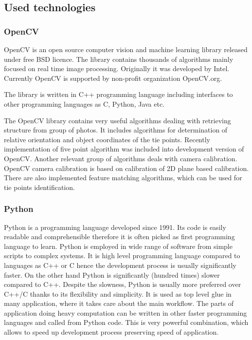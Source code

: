 \documentclass[a4paper,12pt]{article}
\begin{document}
\subsection{Used technologies}

\subsubsection{OpenCV}


OpenCV is an open source computer vision and machine learning library released under free BSD licence.
The library contains thousands of algorithms mainly focused on real time image processing.
Originally it was developed by Intel. Currently OpenCV is supported by non-profit organization OpenCV.org.

The library is written in C++ programming language including interfaces to other programming languages as C, Python, Java etc. 

The OpenCV library contains very useful algorithms dealing with retrieving structure from group 
of photos. It includes algorithms for determination of relative orientation 
and object coordinates of the tie points.
Recently implementation of five point algorithm was included into development version of OpenCV.
Another relevant group of algorithms deals with camera calibration. OpenCV  camera calibration
is based on calibration of 2D plane based calibration.  
There are also implemented feature matching algorithms, which can be used for tie points identification. 


\subsubsection{Python}

Python is a programming language developed since 1991. 
Its code is easily readable and comprehensible therefore it is often picked as first programming
language to learn. Python is employed in wide range of software from simple scripts to complex systems.
It is high level programming language compared to languages as C++ or C hence 
the development process is usually significantly faster. On the other hand 
Python is significantly (hundred times) slower compared to C++. Despite the slowness, 
 Python is usually more preferred over C++/C thanks to its flexibility and simplicity.
It is used as top level glue in many application, where it takes care about 
the main workflow. The parts of application doing heavy computation can 
be written in other faster programming languages and called 
from Python code. This is very powerful combination, which allows to speed up development 
process preserving speed of application.
\end{document}
